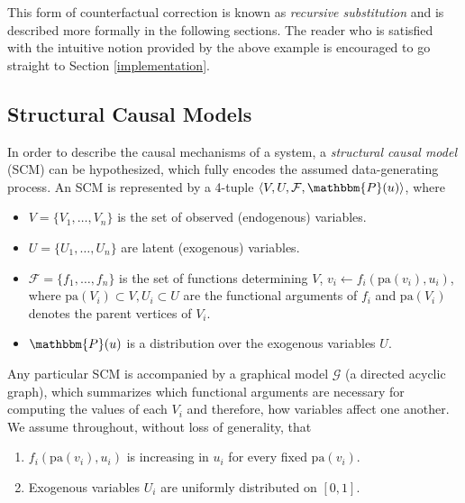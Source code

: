 \documentclass[
  nojss]{jss}
\providecommand{\tightlist}{%
  \setlength{\itemsep}{0pt}\setlength{\parskip}{0pt}}
\begin{document}
This form of counterfactual correction is known as \emph{recursive
substitution} \citep[Chapter~7]{pearl2009causality} and is described
more formally in the following sections. The reader who is satisfied
with the intuitive notion provided by the above example is encouraged to
go straight to Section \ref{implementation}.

\hypertarget{structural-causal-models}{%
\subsection{Structural Causal Models}\label{structural-causal-models}}

In order to describe the causal mechanisms of a system, a
\emph{structural causal model} (SCM) can be hypothesized, which fully
encodes the assumed data-generating process. An SCM is represented by a
4-tuple \(\langle V, U, \mathcal{F}, \mathbbm{P}(u) \rangle\), where

\begin{itemize}
\tightlist
\item
  \(V = \lbrace V_1, \ldots, V_n \rbrace\) is the set of observed
  (endogenous) variables.
\item
  \(U = \lbrace U_1, \ldots, U_n \rbrace\) are latent (exogenous)
  variables.
\item
  \(\mathcal{F} = \lbrace f_1, \ldots, f_n \rbrace\) is the set of
  functions determining \(V\), \(v_i \gets f_i(\mathrm{pa}(v_i), u_i)\),
  where \(\mathrm{pa}(V_i) \subset V, U_i \subset U\) are the functional
  arguments of \(f_i\) and \(\mathrm{pa}(V_i)\) denotes the parent
  vertices of \(V_i\).
\item
  \(\mathbbm{P}(u)\) is a distribution over the exogenous variables
  \(U\).
\end{itemize}

Any particular SCM is accompanied by a graphical model \(\mathcal{G}\)
(a directed acyclic graph), which summarizes which functional arguments
are necessary for computing the values of each \(V_i\) and therefore,
how variables affect one another. We assume throughout, without loss of
generality, that

\begin{enumerate}
\def\labelenumi{(\roman{enumi})}
\tightlist
\item
  \(f_i(\mathrm{pa}(v_i), u_i)\) is increasing in \(u_i\) for every
  fixed \(\mathrm{pa}(v_i)\).
\item
  Exogenous variables \(U_i\) are uniformly distributed on \([0, 1]\).
\end{enumerate}
\end{document}
